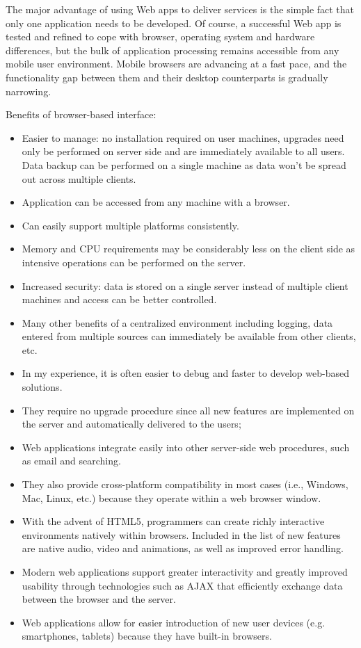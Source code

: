 The major advantage of using Web apps to deliver services is the simple fact that only one application needs to be developed. Of course, a successful Web app is tested and refined to cope with browser, operating system and hardware differences, but the bulk of application processing remains accessible from any mobile user environment. Mobile browsers are advancing at a fast pace, and the functionality gap between them and their desktop counterparts is gradually narrowing.

Benefits of browser-based interface:
\begin{itemize}
\item Easier to manage: no installation required on user machines, upgrades need only be performed on server side and are immediately available to all users. Data backup can be performed on a single machine as data won't be spread out across multiple clients.
\item Application can be accessed from any machine with a browser.
\item Can easily support multiple platforms consistently.
\item Memory and CPU requirements may be considerably less on the client side as intensive operations can be performed on the server.
\item Increased security: data is stored on a single server instead of multiple client machines and access can be better controlled.
\item Many other benefits of a centralized environment including logging, data entered from multiple sources can immediately be available from other clients, etc.
\item In my experience, it is often easier to debug and faster to develop web-based solutions.
\item They require no upgrade procedure since all new features are implemented on the server and automatically delivered to the users;
\item Web applications integrate easily into other server-side web procedures, such as email and searching.
\item They also provide cross-platform compatibility in most cases (i.e., Windows, Mac, Linux, etc.) because they operate within a web browser window.
\item With the advent of HTML5, programmers can create richly interactive environments natively within browsers. Included in the list of new features are native audio, video and animations, as well as improved error handling.
\item Modern web applications support greater interactivity and greatly improved usability through technologies such as AJAX that efficiently exchange data between the browser and the server.
\item Web applications allow for easier introduction of new user devices (e.g. smartphones, tablets) because they have built-in browsers.
\end{itemize}

